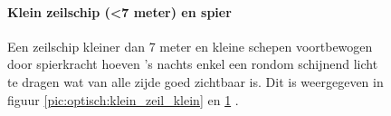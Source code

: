 \begin{figure}[H]
	\centering
	\begin{minipage}[t]{0.50\textwidth}
		\paragraph{Klein zeilschip (<7 meter) en spier}
		Een zeilschip kleiner dan 7 meter en kleine schepen voortbewogen door spierkracht hoeven 's nachts enkel een rondom schijnend licht te dragen wat van alle zijde goed zichtbaar is. Dit is weergegeven in figuur  \ref{pic:optisch:klein_zeil_klein} en \ref{pic:optisch:klein_spier} .
	\end{minipage}
	\hfill
	\begin{minipage}[t]{0.22\textwidth}
		\RemoveLine
		\caption{}
		\label{pic:optisch:klein_zeil_klein}
	\end{minipage}
	\hfill
	\begin{minipage}[t]{0.22\textwidth}
		\RemoveLine
		\caption{}
		\label{pic:optisch:klein_spier}
	\end{minipage}
\end{figure}%

